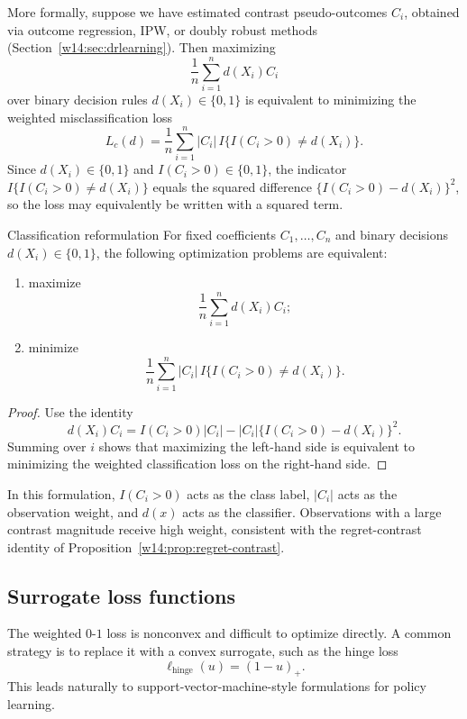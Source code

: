 \documentclass[master.tex]{subfiles}
\begin{document}
More formally, suppose we have estimated contrast pseudo-outcomes \(C_i\), obtained via outcome regression, IPW, or doubly robust methods (Section~\ref{w14:sec:drlearning}). Then maximizing
\[
\frac{1}{n}\sum_{i=1}^n d(X_i)C_i
\]
over binary decision rules \(d(X_i)\in\{0,1\}\) is equivalent to minimizing the weighted misclassification loss
\[
L_c(d)=\frac{1}{n}\sum_{i=1}^n |C_i|\,I\bigl\{I(C_i>0)\neq d(X_i)\bigr\}.
\]
Since \(d(X_i)\in\{0,1\}\) and \(I(C_i>0)\in\{0,1\}\), the indicator
\(I\{I(C_i>0)\neq d(X_i)\}\) equals the squared difference
\(\{I(C_i>0)-d(X_i)\}^2\), so the loss may equivalently be written with a
squared term.

\begin{prop}{Classification reformulation}
\label{w14:prop:classification}
For fixed coefficients \(C_1,\dots,C_n\) and binary decisions \(d(X_i)\in\{0,1\}\), the following optimization problems are equivalent:
\begin{enumerate}
    \item maximize
    \[
    \frac{1}{n}\sum_{i=1}^n d(X_i)C_i;
    \]
    \item minimize
    \[
    \frac{1}{n}\sum_{i=1}^n |C_i|\,I\bigl\{I(C_i>0)\neq d(X_i)\bigr\}.
    \]
\end{enumerate}
\end{prop}

\begin{proof}
Use the identity
\[
d(X_i)C_i
=
I(C_i>0)|C_i|
-
|C_i|\{I(C_i>0)-d(X_i)\}^2.
\]
Summing over \(i\) shows that maximizing the left-hand side is equivalent to minimizing the weighted classification loss on the right-hand side.
\end{proof}

\begin{remark}
In this formulation, \(I(C_i>0)\) acts as the class label, \(|C_i|\) acts as
the observation weight, and \(d(x)\) acts as the classifier. Observations
with a large contrast magnitude receive high weight, consistent with the
regret-contrast identity of Proposition~\ref{w14:prop:regret-contrast}.
\end{remark}

\subsection{Surrogate loss functions}

The weighted \(0\)-\(1\) loss is nonconvex and difficult to optimize directly. A common strategy is to replace it with a convex surrogate, such as the hinge loss
\[
\ell_{\mathrm{hinge}}(u)=(1-u)_+.
\]
This leads naturally to support-vector-machine-style formulations for policy learning.
\end{document}
